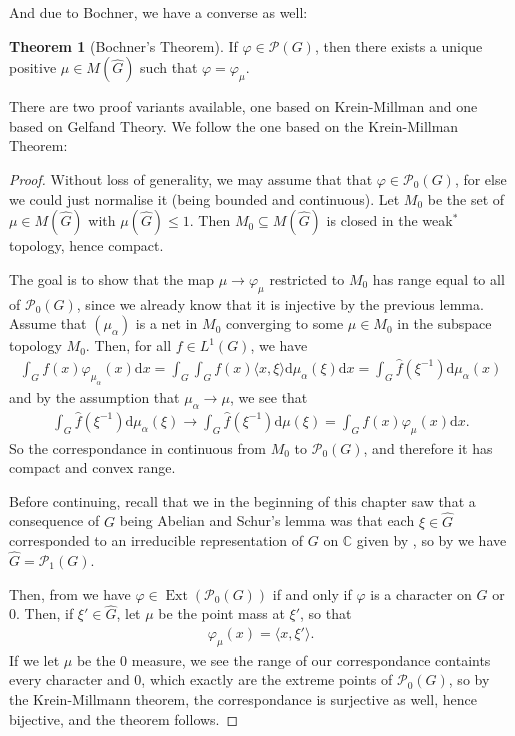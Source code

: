 \documentclass[10pt,twoside,openany,final]{memoir}
\theoremstyle{definition}
\newtheorem{theorem}{Theorem}[chapter]
\theoremstyle{Break}
\newcommand{\C}{\mathbb{C}}
\newcommand{\G}{\widehat{G}}
\renewcommand{\P}{\mathcal{P}}
\DeclareMathOperator{\Ext}{Ext}
\renewcommand{\d}{\mathrm{d}}
\begin{document}
And due to Bochner, we have a converse as well:
\begin{theorem}[Bochner's Theorem]
	If $\varphi \in \P(G)$, then there exists a unique positive $\mu \in M(\G)$ such that $\varphi = \varphi_\mu$.	
	\label{4.18}
\end{theorem}
There are two proof variants available, one based on Krein-Millman and one based on Gelfand Theory. We follow the one based on the Krein-Millman Theorem:
\begin{proof}
Without loss of generality, we may assume that that $\varphi \in \P_0(G)$, for else we could just normalise it (being bounded and continuous). Let $M_0$ be the set of $\mu \in M(\G)$ with $\mu(\G)\leq 1$. Then $M_0\subseteq M(\G)$ is closed in the weak$^*$ topology, hence compact.

	The goal is to show that the map $\mu \to \varphi_\mu$ restricted to $M_0$ has range equal to all of $\P_0(G)$, since we already know that it is injective by the previous lemma. Assume that $(\mu_\alpha)$ is a net in $M_0$ converging to some $\mu \in M_0$ in the subspace topology $M_0$. Then, for all $f \in L^1(G)$, we have
\begin{align*}
	\int_G f(x) \varphi_{\mu_\alpha}(x) \d x = \int_G \int_G f(x) \langle x,\xi \rangle \d \mu_{\alpha}(\xi) \d x = \int_{G}\widehat{f}(\xi^{-1}) \d \mu_\alpha(x)
\end{align*}
and by the assumption that $\mu_\alpha \to \mu$, we see that
\begin{align*}
	\int_G \widehat{f}(\xi^{-1}) \d \mu_\alpha (\xi) \to \int_G \widehat{f} (\xi^{-1}) \d \mu(\xi) = \int_G f(x) \varphi_\mu(x) \d x.
\end{align*}
So the correspondance in continuous from $M_0$ to $\P_0(G)$, and therefore it has compact and convex range. 

Before continuing, recall that we in the beginning of this chapter saw that a consequence of $G$ being Abelian and Schur's lemma was that each $\xi \in \G$ corresponded to an irreducible representation of $G$ on $\C$ given by , so by  we have $\G=\P_1(G)$.  

Then, from  we have $\varphi \in \Ext(\P_0(G))$ if and only if $\varphi$ is a character on $G$ or $0$. Then, if $\xi' \in \G$, let $\mu$ be the point mass at $\xi'$, so that 
\begin{align*}
	\varphi_\mu(x)=\langle x, \xi' \rangle.
\end{align*}
If we let $\mu$ be the $0$ measure, we see the range of our correspondance containts every character and $0$, which exactly are the extreme points of $\P_0(G)$, so by the Krein-Millmann theorem, the correspondance is surjective as well, hence bijective, and the theorem follows.
\end{proof}
\end{document}
